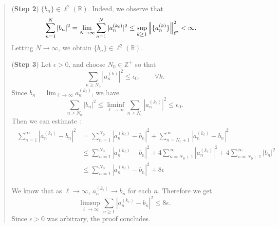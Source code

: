 \documentclass{article}
\begin{document}
\begin{itemize}
\begin{solutions}
\begin{quote}
			(\textbf{Step 2}) $\{b_{n}\} \in \ell^{2}(\mathbb{R})$. Indeed, we observe that 
			\begin{align}
				\begin{split}
					\sum_{n = 1}^{N}|b_{n}|^{2} &= \lim_{N \to \infty}\sum_{n = 1}^{N}|a_{n}^{(k_{\ell})}|^{2} \leq \sup_{k\geq 1}\left\Vert \{a_{n}^{(k)}\} \right\Vert_{\ell^{2}}^{2} < \infty.
				\end{split}
			\end{align}
			Letting $N \to \infty$, we obtain $\{b_{n}\} \in \ell^{2}(\mathbb{R})$. 
			
			(\textbf{Step 3}) Let $\epsilon > 0$, and choose $N_{0} \in \mathbb{Z}^{+}$ so that 
			\begin{equation}
				\sum_{n \geq N_{0}}|a_{n}^{(k)}|^{2} \leq \epsilon_{0}, \qquad \forall k. 
			\end{equation}
			Since $b_{n}= \lim_{\ell \to \infty}a_{n}^{(k_{\ell})}$, we have 
			\begin{equation}
				\sum_{n\geq N_{0}}|b_{n}|^{2} \leq \liminf_{\ell \to \infty}\sum_{n\geq N_{0}}|a_{n}^{(k_{\ell})}|^{2} \leq \epsilon_{0}. 
			\end{equation}
			Then we can estimate :
			\begin{align}
				\begin{split}
					\sum_{n=1}^{\infty} |a_n^{(k_{\ell})} - b_n|^2
					&= \sum_{n=1}^{N_0} |a_n^{(k_{\ell})} - b_n|^2
					+ \sum_{n=N_0+1}^{\infty} |a_n^{(k_{\ell})} - b_n|^2 \\
					&\leq \sum_{n=1}^{N_0} |a_n^{(k_{\ell})} - b_n|^2
					+ 4 \sum_{n=N_0+1}^{\infty} |a_n^{(k_{\ell})}|^2
					+ 4 \sum_{n=N_0+1}^{\infty} |b_n|^2 \\
					&\leq \sum_{n=1}^{N_0} |a_n^{(k_{\ell})} - b_n|^2 + 8\epsilon
				\end{split}
			\end{align}
			
			We know that as $\ell \to \infty$, $a_n^{(k_{\ell})} \to b_n$ for each $n$. Therefore we get 
			\begin{equation}
				\limsup_{\ell \to \infty}\sum_{n\geq 1}|a_{n}^{(k_{\ell})} - b_{n}|^{2} \leq 8 \epsilon. 
			\end{equation}
			Since $\epsilon > 0$ was arbitrary, the proof concludes. 
		\end{quote}
	\end{solutions}
	

\end{itemize}
\end{document}
